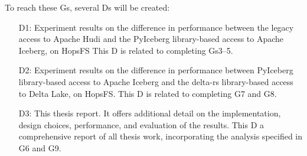 To reach these \glspl{G}, several \glspl{D} will be created:
\begin{enumerate}
    \item[D1:] Experiment results on the difference in performance between the legacy access to Apache Hudi and the PyIceberg library-based access to Apache Iceberg, on \gls{HopsFS}
    This \gls{D} is related to completing \glspl{G}3--5.
    \item[D2:] Experiment results on the difference in performance between PyIceberg library-based access to Apache Iceberg and the delta-rs library-based access to Delta Lake, on \gls{HopsFS}.
    This \gls{D} is related to completing \gls{G}7 and \gls{G}8.
    \item[D3:] This thesis report. It offers additional detail on the implementation, design choices, performance, and evaluation of the results.
    This \gls{D} a comprehensive report of all thesis work, incorporating the analysis specified in \gls{G}6 and \gls{G}9.
\end{enumerate}
